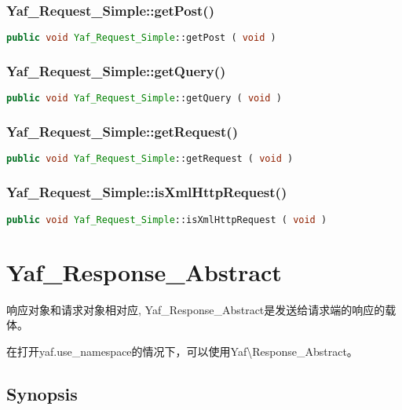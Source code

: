 \subsection{Yaf\_Request\_Simple::getPost()}


\begin{lstlisting}[language=PHP]
public void Yaf_Request_Simple::getPost ( void )
\end{lstlisting}

\subsection{Yaf\_Request\_Simple::getQuery()}


\begin{lstlisting}[language=PHP]
public void Yaf_Request_Simple::getQuery ( void )
\end{lstlisting}


\subsection{Yaf\_Request\_Simple::getRequest()}


\begin{lstlisting}[language=PHP]
public void Yaf_Request_Simple::getRequest ( void )
\end{lstlisting}

\subsection{Yaf\_Request\_Simple::isXmlHttpRequest()}


\begin{lstlisting}[language=PHP]
public void Yaf_Request_Simple::isXmlHttpRequest ( void )
\end{lstlisting}

\chapter{Yaf\_Response\_Abstract}

响应对象和请求对象相对应, Yaf\_Response\_Abstract是发送给请求端的响应的载体。

在打开yaf.use\_namespace的情况下，可以使用Yaf\textbackslash Response\_Abstract。

\section{Synopsis}



